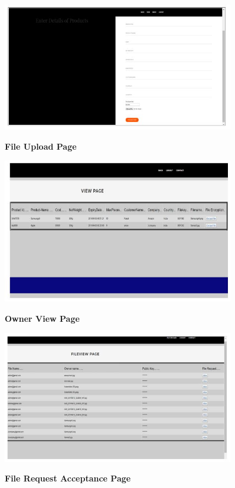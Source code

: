 \documentclass[BTech]{srmuthesis}
\begin{document}
\begin{figure}[H]
\centering
\includegraphics[width=0.9\textwidth]{filepage.jpg}
\label{Figure:10} \hspace{10mm}
\caption{\textbf{File Upload Page}}
\end{figure}

\begin{figure}[H]
\centering
\includegraphics[width=0.9\textwidth]{Ownerviewpage.jpg}
\label{Figure:10} \hspace{10mm}
\caption{\textbf{Owner View Page}}
\end{figure}

\begin{figure}[H]
\centering
\includegraphics[width=0.9\textwidth]{filerequestacceptpage.jpg}
\label{Figure:10} \hspace{10mm}
\caption{\textbf{File Request Acceptance Page}}
\end{figure}
\end{document}
